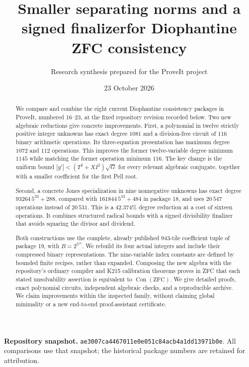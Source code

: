 \documentclass[11pt]{article}
\title{Smaller separating norms and a signed finalizer\newline for Diophantine ZFC consistency}
\author{Research synthesis prepared for the ProveIt project}
\date{23 October 2026}
\theoremstyle{definition}\newtheorem{definition}[theorem]{Definition}
\theoremstyle{remark}\newtheorem{remark}[theorem]{Remark}
\newcommand{\Con}{\operatorname{Con}}
\newcommand{\ZFC}{\mathrm{ZFC}}
\newcommand{\pin}{\texttt{ae3007ca4467011e0e051c84acb4a1dd13971b0e}}
\begin{document}
\maketitle
\begin{abstract}
We compare and combine the eight current Diophantine consistency packages in
ProveIt, numbered 16--23, at the fixed repository revision recorded below.
Two new algebraic reductions give concrete improvements. First, a polynomial
in twelve strictly positive integer unknowns has exact degree $1081$ and a
division-free circuit of $116$ binary arithmetic operations. Its
three-equation presentation has maximum degree $1072$ and $112$ operations.
This improves the former twelve-variable degree minimum $1145$ while matching
the former operation minimum $116$. The key change is the uniform bound
$|y'|<(T^2+XI^2)\sqrt G$ for every relevant algebraic conjugate, together with
a smaller coefficient for the first Pell root.

Second, a concrete Jones specialization in nine nonnegative unknowns has
exact degree $93264\,5^{33}+288$, compared with $161844\,5^{33}+484$ in
package 18, and uses $20\,547$ operations instead of $20\,531$. This is a
$42.374\%$ degree reduction at a cost of sixteen operations. It combines
structured radical bounds with a signed divisibility finalizer that avoids
squaring the divisor and dividend.

Both constructions use the complete, already published 943-tile coefficient
tuple of package 19, with $B=2^{5^{10}}$. We rebuild its four actual integers
and include their compressed binary representations. The nine-variable
index constants are defined by bounded finite recipes, rather than expanded.
Composing the new algebra with the repository's ordinary compiler and K215
calibration theorems proves in ZFC that each stated unsolvability assertion
is equivalent to $\Con(\ZFC)$. We give detailed proofs, exact polynomial
circuits, independent algebraic checks, and a reproducible archive. We claim
improvements within the inspected family, without claiming global minimality
or a new end-to-end proof-assistant certificate.
\end{abstract}

\noindent\textbf{Repository snapshot.} \pin. All comparisons use that snapshot;
the historical package numbers are retained for attribution.
\clearpage
\tableofcontents
\newpage






\end{document}
